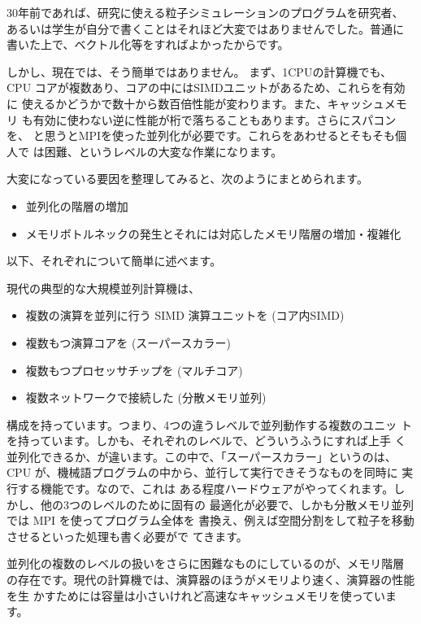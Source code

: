 \documentclass{jspf}            %
\begin{document}
30年前であれば、研究に使える粒子シミュレーションのプログラムを研究者、
あるいは学生が自分で書くことはそれほど大変ではありませんでした。普通に
書いた上で、ベクトル化等をすればよかったからです。

しかし、現在では、そう簡単ではありません。
まず、1CPUの計算機でも、
CPU コアが複数あり、コアの中にはSIMDユニットがあるため、これらを有効に
使えるかどうかで数十から数百倍性能が変わります。また、キャッシュメモリ
も有効に使わない逆に性能が桁で落ちることもあります。さらにスパコンを、
と思うとMPIを使った並列化が必要です。これらをあわせるとそもそも個人で
は困難、というレベルの大変な作業になります。

大変になっている要因を整理してみると、次のようにまとめられます。

\begin{itemize}

\item 並列化の階層の増加

\item メモリボトルネックの発生とそれには対応したメモリ階層の増加・複雑化

  
\end{itemize}  

以下、それぞれについて簡単に述べます。

現代の典型的な大規模並列計算機は、

\begin{itemize}

\item 複数の演算を並列に行う SIMD 演算ユニットを (コア内SIMD)
\item 複数もつ演算コアを (スーパースカラー)
\item 複数もつプロセッサチップを (マルチコア)
\item 複数ネットワークで接続した (分散メモリ並列)

\end{itemize}  
構成を持っています。つまり、4つの違うレベルで並列動作する複数のユニッ
トを持っています。しかも、それぞれのレベルで、どういうふうにすれば上手
く並列化できるか、が違います。この中で、「スーパースカラー」というのは、
CPU が、機械語プログラムの中から、並行して実行できそうなものを同時に
実行する機能です。なので、これは
ある程度ハードウェアがやってくれます。しかし、他の3つのレベルのために固有の
最適化が必要で、しかも分散メモリ並列では MPI を使ってプログラム全体を
書換え、例えば空間分割をして粒子を移動させるといった処理も書く必要がで
てきます。

並列化の複数のレベルの扱いをさらに困難なものにしているのが、メモリ階層
の存在です。現代の計算機では、演算器のほうがメモリより速く、演算器の性能を生
かすためには容量は小さいけれど高速なキャッシュメモリを使っています。
\end{document}
